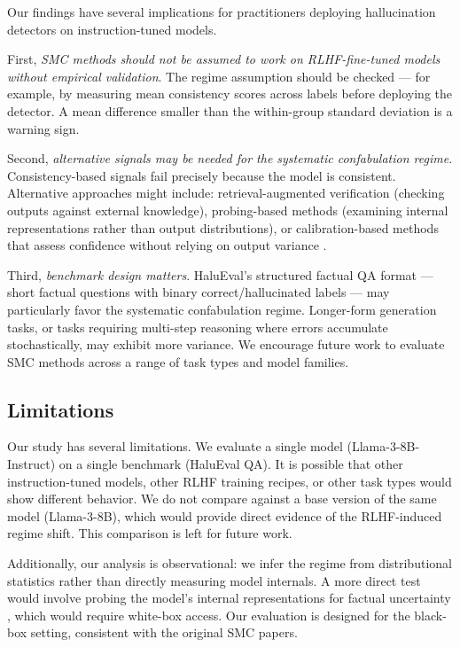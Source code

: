 Our findings have several implications for practitioners deploying hallucination detectors on instruction-tuned models.

First, \emph{SMC methods should not be assumed to work on RLHF-fine-tuned models without empirical validation}. The regime assumption should be checked --- for example, by measuring mean consistency scores across labels before deploying the detector. A mean difference smaller than the within-group standard deviation is a warning sign.

Second, \emph{alternative signals may be needed for the systematic confabulation regime}. Consistency-based signals fail precisely because the model is consistent. Alternative approaches might include: retrieval-augmented verification (checking outputs against external knowledge), probing-based methods (examining internal representations rather than output distributions), or calibration-based methods that assess confidence without relying on output variance \cite{Kadavath2022Language,Xiong2023Can}.

Third, \emph{benchmark design matters}. HaluEval's structured factual QA format --- short factual questions with binary correct/hallucinated labels --- may particularly favor the systematic confabulation regime. Longer-form generation tasks, or tasks requiring multi-step reasoning where errors accumulate stochastically, may exhibit more variance. We encourage future work to evaluate SMC methods across a range of task types and model families.

\subsection{Limitations}

Our study has several limitations. We evaluate a single model (Llama-3-8B-Instruct) on a single benchmark (HaluEval QA). It is possible that other instruction-tuned models, other RLHF training recipes, or other task types would show different behavior. We do not compare against a base version of the same model (Llama-3-8B), which would provide direct evidence of the RLHF-induced regime shift. This comparison is left for future work.

Additionally, our analysis is observational: we infer the regime from distributional statistics rather than directly measuring model internals. A more direct test would involve probing the model's internal representations for factual uncertainty \cite{Kadavath2022Language}, which would require white-box access. Our evaluation is designed for the black-box setting, consistent with the original SMC papers.

